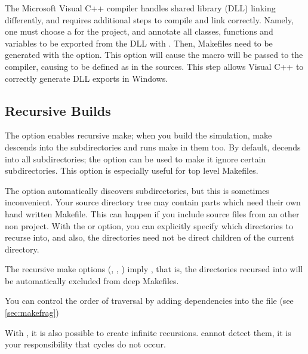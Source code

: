 \ifcommercial
\begin{note}
The Microsoft Visual C++ compiler handles shared library (DLL) linking
differently, and requires additional steps to compile and link correctly.
Namely, one must choose a  for the project, and annotate all classes,
functions and variables to be exported from the DLL with .
Then, Makefiles need to be generated with the  option.
This option will cause the  macro will be passed to
the compiler, causing  to be defined as  in
the sources. This step allows Visual C++ to correctly generate DLL exports in Windows.
\end{note}


\fi


\subsection{Recursive Builds}
\label{sec:build-sim-progs:recursive-builds}


The  option enables recursive make; when you build the simulation, make
descends into the subdirectories and runs make in them too.
By default,  decends into all subdirectories; the  option
can be used to make it ignore certain subdirectories. This option is especially useful
for top level Makefiles.


The  option automatically discovers subdirectories, but this
is sometimes inconvenient. Your source directory tree may contain
parts which need their own hand written Makefile. This can happen if
you include source files from an other non {\opp} project. With the 
or  option, you can explicitly specify which directories to
recurse into, and also, the directories need not be direct children of the
current directory.


The recursive make options (, , )
imply , that is, the directories recursed into will be
automatically excluded from deep Makefiles.


You can control the order of traversal by adding dependencies into
the  file (see \ref{sec:makefrag})

\begin{note}
With , it is also possible to create infinite recursions.
 cannot detect them, it is your responsibility that
cycles do not occur.
\end{note}


